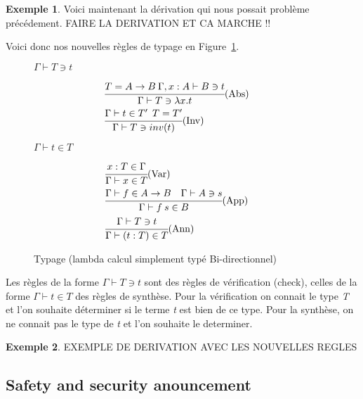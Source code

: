 \documentclass {article}
\theoremstyle{definition}
\newtheorem{example}{Exemple}
\theoremstyle{remark}
\begin{document}
\begin{example}
Voici maintenant la dérivation qui nous possait problème précédement.
FAIRE LA DERIVATION ET CA MARCHE !!
\end{example}

Voici donc nos nouvelles règles de typage en Figure~\ref{fig:typage-simple-bi-direct}.

\begin{figure}

\center\(\Gamma\vdash T \ni t\)  

\begin{align*}
  &\cfrac{T = A \rightarrow B \: \Gamma, x:A \vdash B \ni t}
  {\Gamma \vdash T \ni \lambda x. t}\mbox{(Abs)}&\: \\
  &\cfrac{\Gamma \vdash t \in T' \:\: T=T'}
  {\Gamma\vdash T \ni inv(t)}\mbox{(Inv)} \\
\end{align*}

\center\(\Gamma\vdash t \in T\) 

\begin{align*}
  &\cfrac{x:T \in \Gamma}
  {\Gamma \vdash x \in T }\mbox{(Var)}&\: \\
  &\cfrac{\Gamma \vdash f \in A\rightarrow B \quad \Gamma\vdash A \ni s }
  {\Gamma\vdash f\:s\in B}\mbox{(App)} \\
  &\cfrac{\Gamma\vdash T \ni t}
    {\Gamma\vdash (t:T) \in T}\mbox{(Ann)} \\
\end{align*}

\caption{Typage (lambda calcul simplement typé Bi-directionnel)}
\label{fig:typage-simple-bi-direct} 
\end{figure}   

Les règles de la forme \(\Gamma\vdash T \ni t\) sont des règles de vérification (check),
celles de la forme \(\Gamma\vdash t \in T\) des règles de synthèse.
Pour la vérification on connait le type \emph{T} et l'on souhaite déterminer si le terme \emph{t}
est bien de ce type. Pour la synthèse, on ne connait pas le type de \emph{t} et l'on souhaite le
determiner.

\begin{example}
EXEMPLE DE DERIVATION AVEC LES NOUVELLES REGLES
\end{example}

\subsection{Safety and security anouncement}
\end{document}
